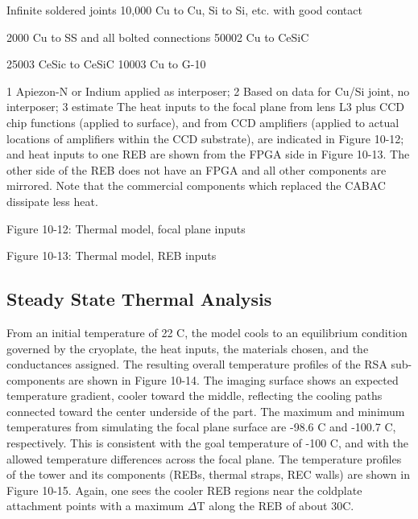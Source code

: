Infinite
soldered joints
10,000	Cu to Cu, Si to Si, etc. with good contact

2000
Cu to SS and all bolted connections
50002
Cu to CeSiC

25003
CeSic to CeSiC
10003
Cu to G-10

1 Apiezon-N or Indium applied as interposer; 2 Based on data for Cu/Si joint, no interposer; 3 estimate
The heat inputs to the focal plane from lens L3 plus CCD chip functions (applied to surface), and from CCD amplifiers (applied to actual locations of amplifiers within the CCD substrate), are indicated in Figure 10-12; and heat inputs to one REB are shown from the FPGA side in Figure 10-13. The other side of the REB does not have an FPGA and all other components are mirrored. Note that the commercial components which replaced the CABAC dissipate less heat. 
 
Figure 10-12: Thermal model, focal plane inputs
 
Figure 10-13: Thermal model, REB inputs

\subsection{Steady State Thermal Analysis}
From an initial temperature of 22 C, the model cools to an equilibrium condition governed by the cryoplate, the heat inputs, the materials chosen, and the conductances assigned. The resulting overall temperature profiles of the RSA sub-components are shown in Figure 10-14. The imaging surface shows an expected temperature gradient, cooler toward the middle, reflecting the cooling paths connected toward the center underside of the part. The maximum and minimum temperatures from simulating the focal plane surface are -98.6 C and -100.7 C, respectively. This is consistent with the goal temperature of -100 C, and with the allowed temperature differences across the focal plane.
The temperature profiles of the tower and its components (REBs, thermal straps, REC walls) are shown in Figure 10-15. Again, one sees the cooler REB regions near the coldplate attachment points with a maximum $\Delta$T along the REB of about 30C.

